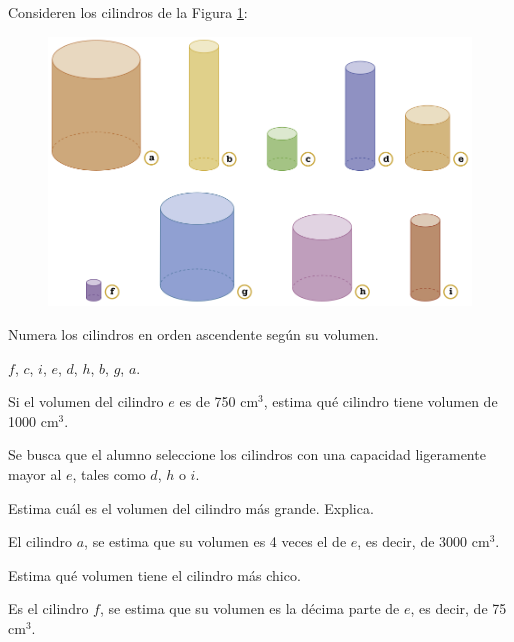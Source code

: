 Consideren los cilindros de la Figura \ref{fig:20230319103650}:

\begin{figure}[H]
    \centering
    \includegraphics[width=.8\linewidth]{../images/20230319103650}
    \caption{}
    \label{fig:20230319103650}
\end{figure}

\begin{parts}
    Numera los cilindros en orden ascendente según su volumen.

    \begin{solutionbox}{1.5cm}
        $f$, $c$, $i$, $e$, $d$, $h$, $b$, $g$, $a$.
    \end{solutionbox}

    Si el volumen del cilindro $e$ es de 750 cm$^3$, estima qué cilindro tiene volumen de 1000 cm$^3$.

    \begin{solutionbox}{1.8cm}
        Se busca que el alumno seleccione los cilindros con una capacidad ligeramente mayor al $e$, tales como $d$, $h$ o $i$.
    \end{solutionbox}

    Estima cuál es el volumen del cilindro más grande. Explica.

    \begin{solutionbox}{1.5cm}
        El cilindro $a$, se estima que su volumen es 4 veces el de $e$, es decir, de 3000 cm$^3$.
    \end{solutionbox}

    Estima qué volumen tiene el cilindro más chico.

    \begin{solutionbox}{1.5cm}
        Es el cilindro $f$, se estima que su volumen es la décima parte de $e$, es decir,
        de 75 cm$^3$.
    \end{solutionbox}
\end{parts}